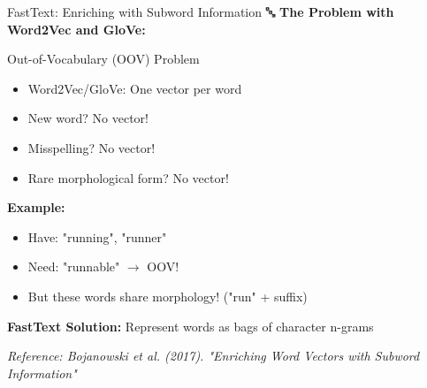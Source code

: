 \documentclass[aspectratio=169]{beamer}
\begin{document}
\begin{frame}[shrink=10]{FastText: Enriching with Subword Information 🔤}
\textbf{The Problem with Word2Vec and GloVe:}

\vspace{1em}

\begin{exampleblock}{Out-of-Vocabulary (OOV) Problem}
\begin{itemize}\setlength{\itemsep}{0pt}
    \item Word2Vec/GloVe: One vector per word
    \item New word? \alert{No vector!}
    \item Misspelling? \alert{No vector!}
    \item Rare morphological form? \alert{No vector!}
\end{itemize}
\end{exampleblock}

\vspace{1em}

\textbf{Example:}
\begin{itemize}\setlength{\itemsep}{0pt}
    \item Have: "running", "runner"
    \item Need: "runnable" $\rightarrow$ \alert{OOV!}
    \item But these words share morphology! ("run" + suffix)
\end{itemize}

\vspace{1em}

\begin{center}
\Large
\textbf{FastText Solution:} Represent words as \alert{bags of character n-grams}
\end{center}

\small
\textit{Reference: Bojanowski et al. (2017). "Enriching Word Vectors with Subword Information"}
\end{frame}
\end{document}
